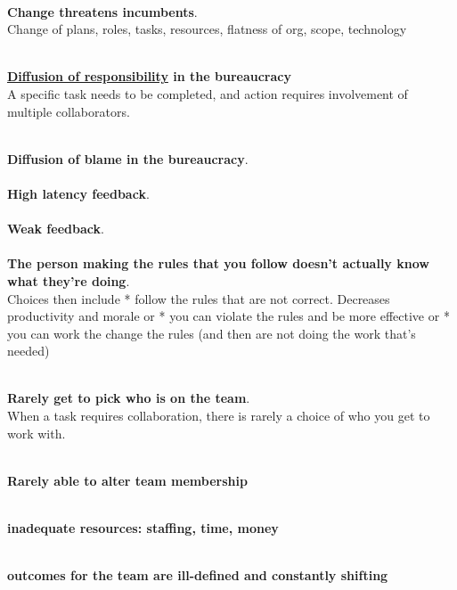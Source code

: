 \ \\

\textbf{Change threatens incumbents}. \\
Change of plans, roles, tasks, resources, flatness of org, scope, technology 

\ \\

\textbf{\href{https://en.wikipedia.org/wiki/Diffusion_of_responsibility}{Diffusion of responsibility} in the bureaucracy} \\
A specific task needs to be completed, and action requires involvement of multiple collaborators. 

\ \\

\textbf{Diffusion of blame in the bureaucracy}. \\

\ \\

\textbf{High latency feedback}. \\

\ \\

\textbf{Weak feedback}. \\

\ \\

\textbf{The person making the rules that you follow doesn't actually know what they're doing}. \\

Choices then include
* follow the rules that are not correct. Decreases productivity and morale
or 
* you can violate the rules and be more effective 
or 
* you can work the change the rules (and then are not doing the work that's needed)


\ \\

\textbf{Rarely get to pick who is on the team}. \\
When a task requires collaboration, there is rarely a choice of who you get to work with. 

\ \\

\textbf{Rarely able to alter team membership}

\ \\

\textbf{inadequate resources: staffing, time, money}

\ \\

\textbf{outcomes for the team are ill-defined and constantly shifting}

